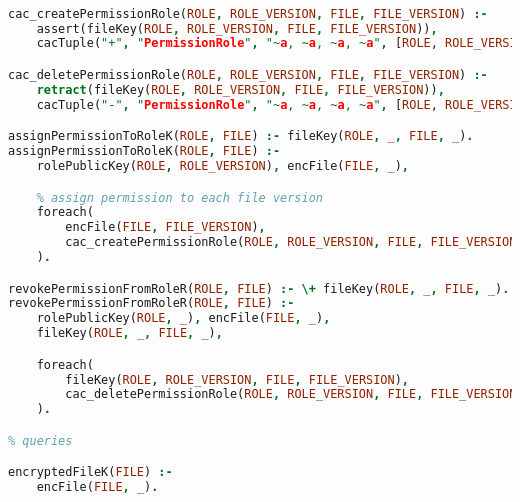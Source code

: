 \begin{lstlisting}[language=Prolog]
% permission-role management

cac_createPermissionRole(ROLE, ROLE_VERSION, FILE, FILE_VERSION) :-
    assert(fileKey(ROLE, ROLE_VERSION, FILE, FILE_VERSION)),
    cacTuple("+", "PermissionRole", "~a, ~a, ~a, ~a", [ROLE, ROLE_VERSION, FILE, FILE_VERSION]).

cac_deletePermissionRole(ROLE, ROLE_VERSION, FILE, FILE_VERSION) :-
    retract(fileKey(ROLE, ROLE_VERSION, FILE, FILE_VERSION)),
    cacTuple("-", "PermissionRole", "~a, ~a, ~a, ~a", [ROLE, ROLE_VERSION, FILE, FILE_VERSION]).

assignPermissionToRoleK(ROLE, FILE) :- fileKey(ROLE, _, FILE, _).
assignPermissionToRoleK(ROLE, FILE) :-
    rolePublicKey(ROLE, ROLE_VERSION), encFile(FILE, _),                                    % checks

    % assign permission to each file version
    foreach(
        encFile(FILE, FILE_VERSION),
        cac_createPermissionRole(ROLE, ROLE_VERSION, FILE, FILE_VERSION)
    ).

revokePermissionFromRoleR(ROLE, FILE) :- \+ fileKey(ROLE, _, FILE, _).
revokePermissionFromRoleR(ROLE, FILE) :- 
    rolePublicKey(ROLE, _), encFile(FILE, _),                                           % checks
    fileKey(ROLE, _, FILE, _),                                                          % permission is assigned

    foreach(
        fileKey(ROLE, ROLE_VERSION, FILE, FILE_VERSION),
        cac_deletePermissionRole(ROLE, ROLE_VERSION, FILE, FILE_VERSION)
    ).

% queries

encryptedFileK(FILE) :- 
    encFile(FILE, _).
\end{lstlisting}
